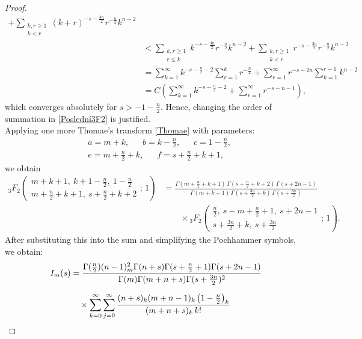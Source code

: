 \documentclass{article}
\theoremstyle{boldremark}
\renewcommand\[{\begin{equation}}
\renewcommand\]{\end{equation}}
\theoremstyle{definition}
\numberwithin{equation}{section}
\begin{document}
\begin{proof}
\begin{align*}
+
\sum_{\substack{k,r\ge 1\\ k<r}}
(k+r)^{-s-\frac{3n}{2}} r^{-\frac n2} k^{n-2}\\
&<
\sum_{\substack{k,r\ge 1\\ r\le k}}
k^{-s-\frac{3n}{2}} r^{-\frac n2} k^{n-2}
+
\sum_{\substack{k,r\ge 1\\ k<r}}
r^{-s-\frac{3n}{2}} r^{-\frac n2} k^{n-2}\\
&=
\sum_{k=1}^{\infty}
k^{-s-\frac n2-2}
\sum_{r=1}^{k} r^{-\frac n2}
+
\sum_{r=1}^{\infty}
r^{-s-2n}
\sum_{k=1}^{r-1} k^{n-2}
\nonumber \\
&=
C\left(\sum_{k=1}^{\infty}
k^{-s-\frac n2-2}
+
\sum_{r=1}^{\infty}
r^{-s-n-1}\right),
\end{align*}
which converges absolutely for $s > -1 - \frac{n}{2}$. Hence, changing the order of summation in \eqref{Poslední3F2} is justified.\\
Applying one more Thomae's transform \eqref{Thomae} with parameters:
\begin{align*}
    & a=m+k,\;\; \quad b=k-\tfrac n2,\;\; \quad c=1-\tfrac n2,\\
    & e=m+\tfrac n2+k,\;\; \quad f=s+\tfrac n2+k+1,
\end{align*}
we obtain 
\begin{align*}
{}_3F_2\!\left(
\begin{matrix}
m+k+1,\ k+1-\tfrac n2,\ 1-\tfrac n2\\[4 pt]
m+\tfrac n2+k+1,\ s+\tfrac n2+k+2
\end{matrix}
;\,1\right)
&=
\frac{
\Gamma\!\left(m+\tfrac n2+k+1\right)\,
\Gamma\!\left(s+\tfrac n2+k+2\right)\,
\Gamma(s+2n-1)
}{
\Gamma(m+k+1)\,
\Gamma\!\left(s+\tfrac{3n}{2}+k\right)\,
\Gamma\!\left(s+\tfrac{3n}{2}\right)
}
\\
&\qquad\times
{}_3F_2\!\left(
\begin{matrix}
\tfrac n2,\ s-m+\tfrac n2+1,\ s+2n-1\\[4 pt]
s+\tfrac{3n}{2}+k,\ s+\tfrac{3n}{2}
\end{matrix}
;\,1\right).
\end{align*}
After substituting this into the sum and simplifying the Pochhammer symbols, we obtain:
\begin{align*}
I_m(s)
&= \frac{\Gamma(\frac{n}{2}) (n-1)_m^2 \Gamma(n+s) \Gamma(s+\frac{n}{2}+1) \Gamma(s+2n-1)}
{\Gamma(m) \Gamma(m+n+s) \Gamma(s+\frac{3n}{2})^2}
\notag \\[6pt]
&\quad \times
\sum_{k=0}^{\infty}
\sum_{j=0}^{\infty}
\frac{(n+s)_k (m+n-1)_k \left(1-\frac{n}{2}\right)_k}{(m+n+s)_k\,k!}

\end{align*}
\end{proof}
\end{document}
